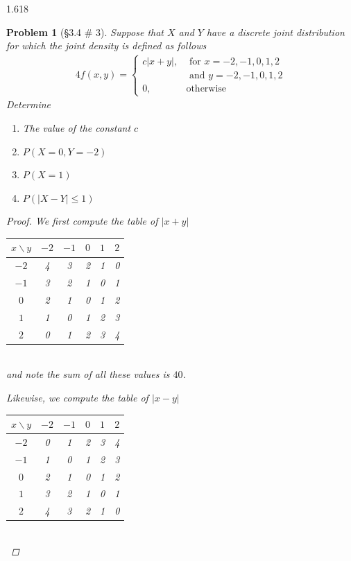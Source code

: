 \documentclass[11pt, oneside]{book}   	%
\newtheorem{problem}{Problem}[section]
\begin{document}
\begin{spacing}{1.618}
			\begin{problem}[\S 3.4 \# 3]
				Suppose that $X$ and $Y$ have a discrete joint distribution for which the joint density is defined as follows
				\begin{alignat}{4}
					f(x, y) = \begin{cases}
						c |x + y|,& \textrm{ for } x = -2, -1, 0, 1, 2 \\
						&\textrm{ and } y = -2, -1, 0, 1, 2 \\
						0,&\textrm{otherwise}
					\end{cases}
				\end{alignat}
				Determine
				\begin{enumerate}
					\item The value of the constant $c$
					\item $P(X = 0, Y = -2)$
					\item $P(X = 1)$
					\item $P(|X - Y| \leq 1)$
				\end{enumerate}
				\begin{proof}
					We first compute the table of $|x + y|$
					\begin{table}[h]
						\centering
							\begin{tabular}{c|ccccc}
								$x \backslash y$ & $-2$ & $-1$ & $0$ & $1$ & $2$ \\
								\hline
								$-2$ & 4 & 3 & 2 & 1 & 0 \\
								$-1$ & 3 & 2 & 1 & 0 & 1 \\
								$0$  & 2 & 1 & 0 & 1 & 2 \\
								$1$  & 1 & 0 & 1 & 2 & 3 \\
								$2$  & 0 & 1 & 2 & 3 & 4 \\
							\end{tabular}
					\end{table} \\
					and note the sum of all these values is $40$. 
					
					Likewise, we  compute the table of $|x - y|$
					\begin{table}[h]
						\centering
							\begin{tabular}{c|ccccc}
								$x \backslash y$ & $-2$ & $-1$ & $0$ & $1$ & $2$ \\
								\hline
								$-2$ & 0 & 1 & 2 & 3 & 4 \\
								$-1$ & 1 & 0 & 1 & 2 & 3 \\
								$0$  & 2 & 1 & 0 & 1 & 2 \\
								$1$  & 3 & 2 & 1 & 0 & 1 \\
								$2$  & 4 & 3 & 2 & 1 & 0 \\
							\end{tabular}
					\end{table} \\
					

\end{proof}
\end{problem}
\end{spacing}
\end{document}
